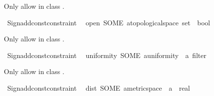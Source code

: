 \begin{isabellebody}
{\isafoldproof}%
%
\isadelimproof
%
\endisadelimproof
%
\isadelimdocument
%
\endisadelimdocument
%
\isatagdocument
%
\isamarkuptrue%
%
\endisatagdocument
{\isafolddocument}%
%
\isadelimdocument
%
\endisadelimdocument
%
\begin{isamarkuptext}%
Only allow  in class .%
\end{isamarkuptext}\isamarkuptrue%
%
\isadelimML
%
\endisadelimML
%
\isatagML
{}\isamarkupfalse%
\ {\isacartoucheopen}Sign{\isachardot}{\kern0pt}add{\isacharunderscore}{\kern0pt}const{\isacharunderscore}{\kern0pt}constraint\isanewline
\ \ {\isacharparenleft}{\kern0pt}\isactrlconstUNDERSCOREname {\isasymopen}open{\isasymclose}{\isacharcomma}{\kern0pt}\ SOME\ \isactrltyp {\isasymopen}{\isacharprime}{\kern0pt}a{\isacharcolon}{\kern0pt}{\isacharcolon}{\kern0pt}topological{\isacharunderscore}{\kern0pt}space\ set\ {\isasymRightarrow}\ bool{\isasymclose}{\isacharparenright}{\kern0pt}{\isacartoucheclose}%
\endisatagML
{\isafoldML}%
%
\isadelimML
%
\endisadelimML
%
\begin{isamarkuptext}%
Only allow  in class .%
\end{isamarkuptext}\isamarkuptrue%
%
\isadelimML
%
\endisadelimML
%
\isatagML
{}\isamarkupfalse%
\ {\isacartoucheopen}Sign{\isachardot}{\kern0pt}add{\isacharunderscore}{\kern0pt}const{\isacharunderscore}{\kern0pt}constraint\isanewline
\ \ {\isacharparenleft}{\kern0pt}\isactrlconstUNDERSCOREname {\isasymopen}uniformity{\isasymclose}{\isacharcomma}{\kern0pt}\ SOME\ \isactrltyp {\isasymopen}{\isacharparenleft}{\kern0pt}{\isacharprime}{\kern0pt}a{\isacharcolon}{\kern0pt}{\isacharcolon}{\kern0pt}uniformity\ {\isasymtimes}\ {\isacharprime}{\kern0pt}a{\isacharparenright}{\kern0pt}\ filter{\isasymclose}{\isacharparenright}{\kern0pt}{\isacartoucheclose}%
\endisatagML
{\isafoldML}%
%
\isadelimML
%
\endisadelimML
%
\begin{isamarkuptext}%
Only allow  in class .%
\end{isamarkuptext}\isamarkuptrue%
%
\isadelimML
%
\endisadelimML
%
\isatagML
{}\isamarkupfalse%
\ {\isacartoucheopen}Sign{\isachardot}{\kern0pt}add{\isacharunderscore}{\kern0pt}const{\isacharunderscore}{\kern0pt}constraint\isanewline
\ \ {\isacharparenleft}{\kern0pt}\isactrlconstUNDERSCOREname {\isasymopen}dist{\isasymclose}{\isacharcomma}{\kern0pt}\ SOME\ \isactrltyp {\isasymopen}{\isacharprime}{\kern0pt}a{\isacharcolon}{\kern0pt}{\isacharcolon}{\kern0pt}metric{\isacharunderscore}{\kern0pt}space\ {\isasymRightarrow}\ {\isacharprime}{\kern0pt}a\ {\isasymRightarrow}\ real{\isasymclose}{\isacharparenright}{\kern0pt}{\isacartoucheclose}%

\end{isabellebody}
